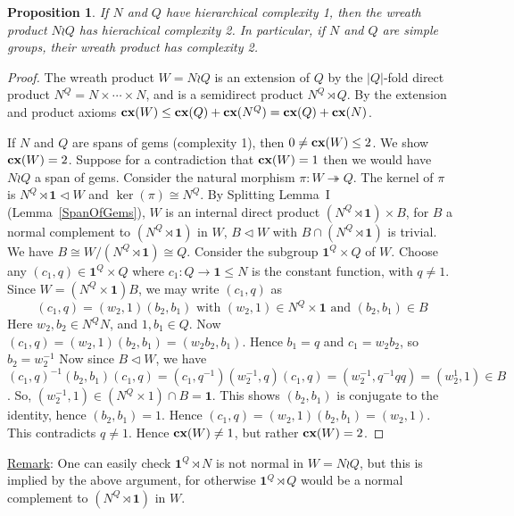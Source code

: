\documentclass[a4paper,11pt]{amsart}
\newtheorem{proposition}[theorem]{Proposition}
\theoremstyle{definition}
\newcommand{\cx}{\mbox{\bf cx}}
\newcommand{\sur}{\twoheadrightarrow}
\newcommand{\1}{{\mathbf 1}}
\begin{document}
\begin{proposition}\label{wreathcpx1}
If $N$ and $Q$ have hierarchical complexity 1, then the wreath product $N\wr Q$ has hierachical complexity 2. 
In particular,  if $N$ and $Q$ are simple groups, their wreath product  has complexity 2. 
\end{proposition}
\begin{proof}
The wreath product $W=N\wr Q$ is an extension of $Q$ by the $|Q|$-fold direct product $N^Q= N \times \cdots \times N$,
and is a semidirect product $N^Q\rtimes Q$.
By the extension and product axioms $\cx(W)\leq \cx(Q) + \cx(N^Q) = \cx(Q)+\cx(N)$.  

If $N$ and $Q$ are spans of gems (complexity 1),  then $0\neq \cx(W)\leq 2$. We show $\cx(W)=2$. 
Suppose for a contradiction that $\cx(W)=1$ then we would have $N\wr Q $ a span of gems.
Consider the natural morphism $\pi: W \sur Q$. The kernel of $\pi$ is $N^Q\rtimes\1 \lhd W$ and $\ker(\pi)\cong N^Q$. 
By Splitting Lemma~I (Lemma~\ref{SpanOfGems}),  $W$ is an internal direct product $(N^Q\rtimes\1) \times B$, for $B$ a normal complement to $(N^Q\rtimes\1)$ in $W$, 
$B\lhd W$ with $B\cap (N^Q\rtimes\1) $ is trivial.  We have $B\cong W/(N^Q\rtimes \1)\cong Q$.   
Consider the subgroup $\1^Q\times Q$ of $W$.  Choose any $(c_1,q)\in \1^Q\times Q$ where $c_1: Q\rightarrow \1 \leq N$ is the constant function, with $q\neq 1$.
Since $W=(N^Q\times \1)B$, we may write $(c_1,q)$ as 
$$(c_1,q)=(w_2,1)(b_2,b_1)\mbox{ with }(w_2,1)\in N^Q\times \1 \mbox{ and }(b_2,b_1)\in B$$
Here $w_2, b_2 \in  N^Q N$, and $1, b_1 \in Q$.   Now $(c_1,q)=(w_2,1)(b_2,b_1)=(w_2b_2,b_1)$.  Hence $b_1=q$ and $c_1=w_2b_2$,
so $b_2=w_2^{-1}$ 
Now since $B\lhd W$, we have 
$(c_1,q)^{-1} (b_2,b_1) (c_1, q)= (c_1, q^{-1})(w_2^{-1},q)(c_1,q)= (w_2^{-1}, q^{-1}qq)=(w_2^{1}, 1) \in B$.
So,  $(w_2^{-1},1)\in (N^Q\times 1)\cap B=\1$. This shows $(b_2,b_1)$ is conjugate to the identity, hence $(b_2,b_1)=1$.
Hence $(c_1,q)=(w_2,1)(b_2,b_1)=(w_2,1)$.  This contradicts $q\neq 1$. Hence $\cx(W)\neq 1$, but rather $\cx(W)=2$.
\end{proof}

\noindent\underline{Remark}: One can easily check $\1^Q\rtimes N$ is not normal in $W=N\wr Q$, but this is implied by the above
argument, for otherwise $\1^Q\rtimes Q$ would be a normal complement to $(N^Q\rtimes\1)$ in $W$.
\end{document}
